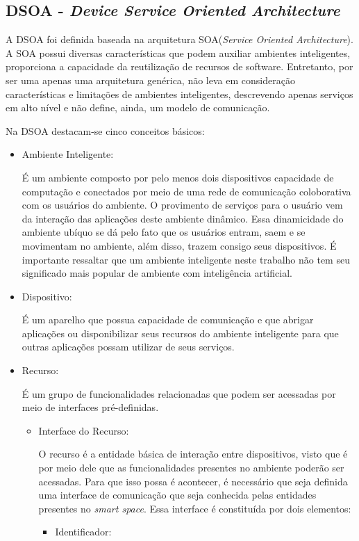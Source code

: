 \subsection{DSOA - \emph{Device Service Oriented Architecture}}

A DSOA foi definida baseada na arquitetura SOA(\emph{Service Oriented Architecture}). A SOA possui diversas características que podem auxiliar ambientes inteligentes, proporciona a capacidade da reutilização de recursos de software. Entretanto, por ser uma apenas uma arquitetura genérica, não leva em consideração características e limitações de ambientes inteligentes, descrevendo apenas serviços em alto nível e não define, ainda, um modelo de comunicação.

Na DSOA destacam-se cinco conceitos básicos:

\begin{itemize}
	\item Ambiente Inteligente:

		É um ambiente composto por pelo menos dois dispositivos capacidade de computação e conectados por meio de uma rede de comunicação coloborativa com os usuários do ambiente. O provimento de serviços para o usuário vem da interação das aplicações deste ambiente dinâmico. Essa dinamicidade do ambiente ubíquo se dá pelo fato que os usuários entram, saem e se movimentam no ambiente, além disso, trazem consigo seus dispositivos. É importante ressaltar que um ambiente inteligente neste trabalho não tem seu significado mais popular de ambiente com inteligência artificial.
	\item Dispositivo:

		É um aparelho que possua capacidade de comunicação e que abrigar aplicações ou disponibilizar seus recursos do ambiente inteligente para que outras aplicações possam utilizar de seus serviços.
	\item Recurso:

		É um grupo de funcionalidades relacionadas que podem ser acessadas por meio de interfaces pré-definidas.
		\begin{itemize}
			\item Interface do Recurso:

				O recurso é a entidade básica de interação entre dispositivos, visto que é por meio dele que as funcionalidades presentes no ambiente poderão ser acessadas. Para que isso possa é acontecer, é necessário que seja definida uma interface de comunicação que seja conhecida pelas entidades presentes no \emph{smart space}. Essa interface é constituída por dois elementos:
				\begin{itemize}
					\item Identificador:


\end{itemize}
\end{itemize}
\end{itemize}
